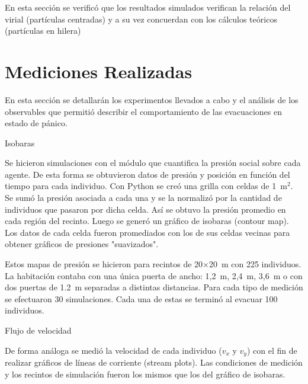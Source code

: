 En esta sección se verificó que los resultados simulados verifican la relación del virial (partículas centradas) y a su vez concuerdan con los cálculos teóricos (partículas en hilera)


\section{\label{med realizadas} Mediciones Realizadas}

En esta sección se detallarán los experimentos llevados a cabo y el análisis de los observables que permitió describir el comportamiento de las evacuaciones en estado de pánico. 

{\Large Isobaras}

Se hicieron simulaciones con el módulo que cuantifica la presión social sobre cada agente. De esta
forma se obtuvieron datos de presión y posición en función del tiempo para cada individuo. Con Python se creó una grilla con celdas de 1~m$^2$. Se sumó la presión asociada a cada una y se la normalizó por la cantidad de individuos que pasaron por dicha celda. Así se obtuvo la presión promedio en cada región del recinto. Luego se generó un gráfico de isobaras (contour map). Los datos de cada celda fueron promediados con los de sus celdas vecinas para obtener gráficos de presiones "suavizados".


Estos mapas de presión se hicieron para recintos de 20$\times$20~m con 225 individuos. La habitación contaba con una única puerta de ancho: 1,2~m, 2,4~m, 3,6~m o con dos puertas de 1.2~m separadas a distintas distancias. Para cada tipo de medición se efectuaron 30 simulaciones. Cada una de estas se terminó al evacuar 100 individuos. 

{\Large Flujo de velocidad}

De forma análoga se medió la velocidad de cada individuo ($v_x$ y $v_y$) con el fin de realizar gráficos de líneas de corriente (stream plots). Las condiciones de medición y los recintos de simulación fueron los mismos que los del gráfico de isobaras. 

